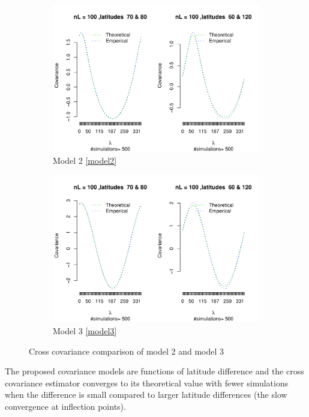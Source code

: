 \begin{figure}
	\begin{subfigure}{1\textwidth}
		\centering
		\includegraphics[keepaspectratio, scale=0.8]{graphs/Model2}
		\caption{Model 2 \eqref{model2}}
		\label{fig:sfig1}
	\end{subfigure}
	\begin{subfigure}{1\textwidth}
		\centering
		\includegraphics[keepaspectratio, scale=0.8]{graphs/Model3}
		\caption{Model 3 \eqref{model3}}
		\label{fig:sfig2}
	\end{subfigure}
\caption{Cross covariance comparison of model 2 and model 3}
\end{figure}


The proposed covariance models are functions of latitude difference and the cross covariance estimator converges to its theoretical value with fewer simulations when the difference is small compared to larger latitude differences (the slow convergence at inflection points).     


